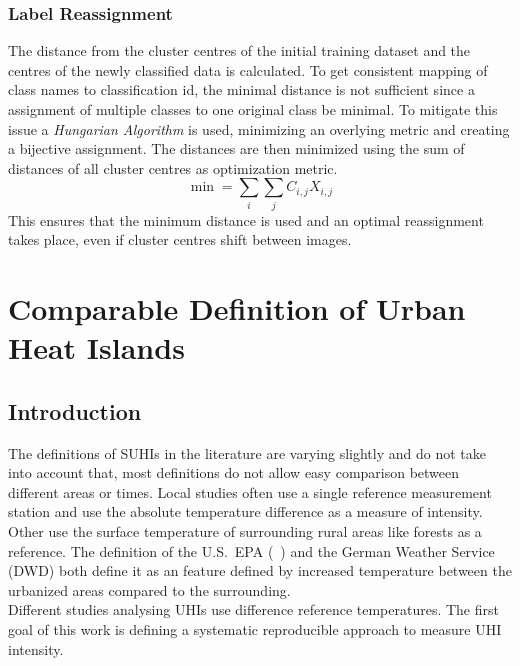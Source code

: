 \documentclass[12pt,a4paper, english,twoside]{scrartcl}
\begin{document}
    \subsubsection{Label Reassignment}\label{sec:labelassignment}
    The distance from the cluster centres of the initial training dataset and the centres of the newly classified data is calculated. 
    To get consistent mapping of class names to classification id, the minimal distance is not sufficient since a assignment of multiple classes to one original class be minimal. 
    To mitigate this issue a \textit{Hungarian Algorithm} is used, minimizing an overlying metric and creating a bijective assignment. 
    The distances are then minimized using the sum of distances of all cluster centres as optimization metric.
      \begin{equation}
        \min = \sum_{i}\sum_{j} C_{i,j}X_{i,j}
      \end{equation}
    This ensures that the minimum distance is used and an optimal reassignment takes place, even if cluster centres shift between images.
\newpage
\section{Comparable Definition of Urban Heat Islands}\label{sec:definition}
    \subsection{Introduction}
      The definitions of \glspl{SUHI} in the literature are varying slightly and do not take into account that, most definitions do not allow easy comparison between different areas or times.
      Local studies often use a single reference measurement station and use the absolute temperature difference as a measure of intensity.
      Other use the surface temperature of surrounding rural areas like forests as a reference.
      The definition of the U.S.~EPA (~\cite{EPA2008}) and the German Weather Service (\gls{DWD}) both define it as an feature defined by increased temperature between the urbanized areas compared to the surrounding.\\ 
      Different studies analysing \glspl{UHI} use difference reference temperatures.
      The first goal of this work is defining a systematic reproducible approach to measure \gls{UHI} intensity.
\end{document}
